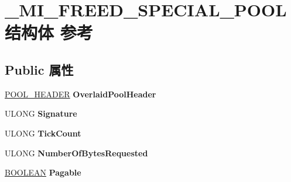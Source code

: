 \hypertarget{struct___m_i___f_r_e_e_d___s_p_e_c_i_a_l___p_o_o_l}{}\section{\+\_\+\+M\+I\+\_\+\+F\+R\+E\+E\+D\+\_\+\+S\+P\+E\+C\+I\+A\+L\+\_\+\+P\+O\+O\+L结构体 参考}
\label{struct___m_i___f_r_e_e_d___s_p_e_c_i_a_l___p_o_o_l}
\subsection*{Public 属性}
\begin{DoxyCompactItemize}
\item 
\mbox{\label{struct___m_i___f_r_e_e_d___s_p_e_c_i_a_l___p_o_o_l_a1b09958a7216bf66f9d687b790d39cb5}} 
\hyperlink{struct___p_o_o_l___h_e_a_d_e_r}{P\+O\+O\+L\+\_\+\+H\+E\+A\+D\+ER} {\bfseries Overlaid\+Pool\+Header}
\item 
\mbox{\label{struct___m_i___f_r_e_e_d___s_p_e_c_i_a_l___p_o_o_l_abcfd2feef3f091ef034cb12ee769ed8a}} 
U\+L\+O\+NG {\bfseries Signature}
\item 
\mbox{\label{struct___m_i___f_r_e_e_d___s_p_e_c_i_a_l___p_o_o_l_ab7ba8898a9c9999f3ea6f65ad218d200}} 
U\+L\+O\+NG {\bfseries Tick\+Count}
\item 
\mbox{\label{struct___m_i___f_r_e_e_d___s_p_e_c_i_a_l___p_o_o_l_a7a6610097c55ac690ea2aefc95ac586f}} 
U\+L\+O\+NG {\bfseries Number\+Of\+Bytes\+Requested}
\item 
\mbox{\label{struct___m_i___f_r_e_e_d___s_p_e_c_i_a_l___p_o_o_l_a8fbe8fdffa7e4b11f0a2d817d27541bd}} 
\hyperlink{_processor_bind_8h_a112e3146cb38b6ee95e64d85842e380a}{B\+O\+O\+L\+E\+AN} {\bfseries Pagable}
\item 
\mbox{\label{struct___m_i___f_r_e_e_d___s_p_e_c_i_a_l___p_o_o_l_a77af561dfe99858e9bedebda598f5c2c}} 

\end{DoxyCompactItemize}
